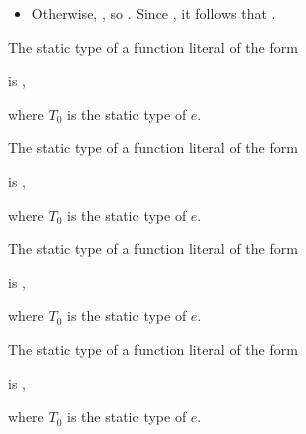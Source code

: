 \documentclass[makeidx]{article}
\begin{document}
{{\begin{itemize}
\item Otherwise, , so
  . Since
  , it follows that
  .
\end{itemize}
}

\LMHash{}%
The static type of a function literal of the form

\noindent
\code{<\TypeParametersStd>}

\noindent
{}

\noindent
is
,

\noindent
where $T_0$ is the static type of $e$.
\EndCase

\LMHash{}%
The static type of a function literal of the form

\noindent
\code{<\TypeParametersStd>}

\noindent
{}

\noindent
is
,

\noindent
where $T_0$ is the static type of $e$.
\EndCase

\LMHash{}%
The static type of a function literal of the form

\noindent
\code{<\TypeParametersStd>}

\noindent
{}

\noindent
is
,

\noindent
where $T_0$ is the static type of $e$.
\EndCase

\LMHash{}%
The static type of a function literal of the form

\noindent
\code{<\TypeParametersStd>}

\noindent
{}

\noindent
is
,

\noindent
where $T_0$ is the static type of $e$.
\EndCase

}
\end{document}
